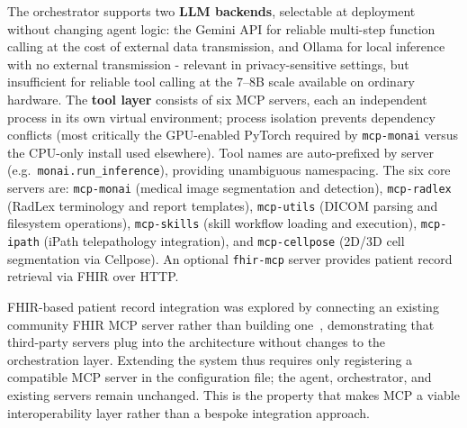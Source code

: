 \documentclass[preprint,12pt]{elsarticle}
\begin{document}
The orchestrator supports two \textbf{LLM backends}, selectable at deployment without changing agent logic: the Gemini API for reliable multi-step function calling at the cost of external data transmission, and Ollama for local inference with no external transmission - relevant in privacy-sensitive settings, but insufficient for reliable tool calling at the 7--8B scale available on ordinary hardware. The \textbf{tool layer} consists of six MCP servers, each an independent process in its own virtual environment; process isolation prevents dependency conflicts (most critically the GPU-enabled PyTorch required by \texttt{mcp-monai} versus the CPU-only install used elsewhere). Tool names are auto-prefixed by server (e.g.\ \texttt{monai.run\_inference}), providing unambiguous namespacing. The six core servers are: \texttt{mcp-monai} (medical image segmentation and detection), \texttt{mcp-radlex} (RadLex terminology and report templates), \texttt{mcp-utils} (DICOM parsing and filesystem operations), \texttt{mcp-skills} (skill workflow loading and execution), \texttt{mcp-ipath} (iPath telepathology integration), and \texttt{mcp-cellpose} (2D/3D cell segmentation via Cellpose). An optional \texttt{fhir-mcp} server provides patient record retrieval via FHIR over HTTP.

FHIR-based patient record integration was explored by connecting an existing community FHIR MCP server rather than building one~\cite{ehtesham2025mcpfhir}, demonstrating that third-party servers plug into the architecture without changes to the orchestration layer. Extending the system thus requires only registering a compatible MCP server in the configuration file; the agent, orchestrator, and existing servers remain unchanged. This is the property that makes MCP a viable interoperability layer rather than a bespoke integration approach.
\end{document}
